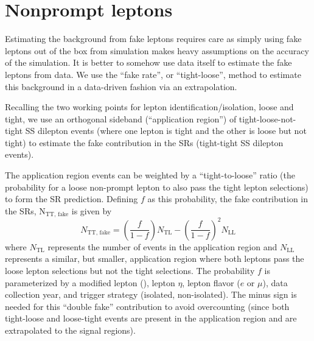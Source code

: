 \FloatBarrier

\section{Nonprompt leptons}


Estimating the background from fake leptons requires care as simply
using fake leptons out of the box from simulation makes heavy assumptions on 
the accuracy of the simulation. It is better to somehow use data itself to estimate
the fake leptons from data.  We use the ``fake rate'', or ``tight-loose'', method
to estimate this background in a data-driven fashion via an extrapolation.

Recalling the two working points for lepton identification/isolation, loose and tight,
we use an orthogonal sideband (``application region'') of tight-loose-not-tight SS dilepton events 
(where one lepton is tight and the other is loose but not tight)
to estimate the fake contribution in the SRs (tight-tight SS dilepton events). 

The application region events can be weighted by a ``tight-to-loose'' ratio
(the probability for a loose non-prompt lepton to also pass the tight lepton selections)
to form the SR prediction. Defining $f$ as this probability, the fake contribution
in the SRs, $\mathrm{N}_\text{TT, fake}$  is given by
\begin{equation}
  N_\text{TT, fake} = \left(\frac{f}{1-f}\right) N_\text{TL}
  - \left(\frac{f}{1-f}\right)^2 N_\text{LL}
\end{equation}
where $N_\text{TL}$ represents the number of events in the application region
and $N_\text{LL}$ represents a similar, but smaller, application region where both
leptons pass the loose lepton selections but not the tight selections. The probability 
$f$ is parameterized by a modified lepton \pt (\ptcorr), lepton $\eta$, lepton flavor ($e$ or $\mu$),
data collection year, and trigger strategy (isolated, non-isolated). The minus sign
is needed for this ``double fake'' contribution to avoid overcounting (since
both tight-loose and loose-tight events are present in the application region and 
are extrapolated to the signal regions).


